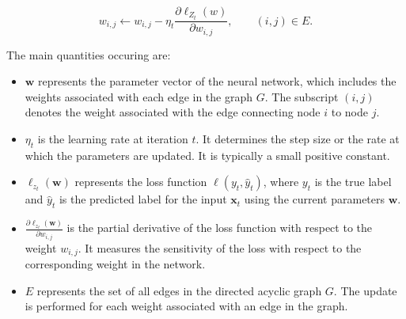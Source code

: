 \begin{itemize}
$$w_{i,j} \leftarrow w_{i,j} - \eta_t \frac{\partial \ell_{Z_t} (w)}{\partial w_{i,j}},\qquad (i,j) \in E.$$

The main quantities occuring are:

\begin{itemize}
\item $\boldsymbol{w}$ represents the parameter vector of the neural network, which includes the weights associated with each edge in the graph $G$. The subscript $(i,j)$ denotes the weight associated with the edge connecting node $i$ to node $j$.
\item $\eta_t$ is the learning rate at iteration $t$. It determines the step size or the rate at which the parameters are updated. It is typically a small positive constant.
\item $\ell_{z_t}(\boldsymbol{w})$ represents the loss function $\ell(y_t, \hat{y}_t)$, where $y_t$ is the true label and $\hat{y}_t$ is the predicted label for the input $\boldsymbol{x}_t$ using the current parameters $\boldsymbol{w}$.
\item $\frac{\partial \ell_{z_t} (\boldsymbol{w})}{\partial w_{i,j}}$ is the partial derivative of the loss function with respect to the weight $w_{i,j}$. It measures the sensitivity of the loss with respect to the corresponding weight in the network.
\item $E$ represents the set of all edges in the directed acyclic graph $G$. The update is performed for each weight associated with an edge in the graph.
\end{itemize}
            
\end{itemize}
